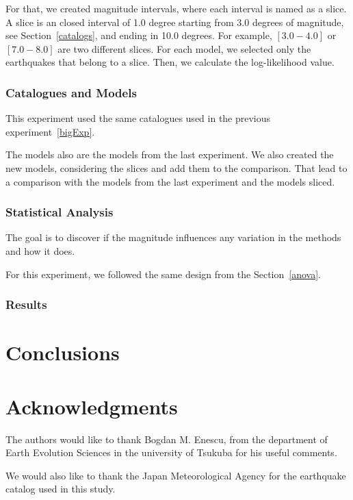 For that, we created magnitude intervals, where each interval is named as a slice. A slice is an closed interval of 1.0 degree  starting from 3.0 degrees of magnitude, see Section~\ref{catalogs}, and ending in 10.0 degrees. For example, $[3.0-4.0]$ or $[7.0-8.0]$ are two different slices. For each model, we selected only the earthquakes that belong to a slice. Then, we calculate the log-likelihood value.


\subsubsection{Catalogues and Models }
This experiment used the same catalogues used in the previous experiment~\ref{bigExp}. 

The models also are the models from the last experiment. We also created the new models, considering the slices and add them to the comparison. That lead to a comparison with the models from the last experiment and the models sliced.


\subsubsection{Statistical Analysis}
The goal is to discover if the magnitude influences any variation in the methods and how it does.

For this experiment, we followed the same design from the Section~\ref{anova}.

\subsubsection{Results}\label{Results}




\section{Conclusions}\label{Conclusions}

\section*{Acknowledgments}
The authors would like to thank Bogdan M. Enescu, from the department
of Earth Evolution Sciences in the university of Tsukuba for his
useful comments. 

We would also like to thank the Japan Meteorological Agency for the
earthquake catalog used in this study.
